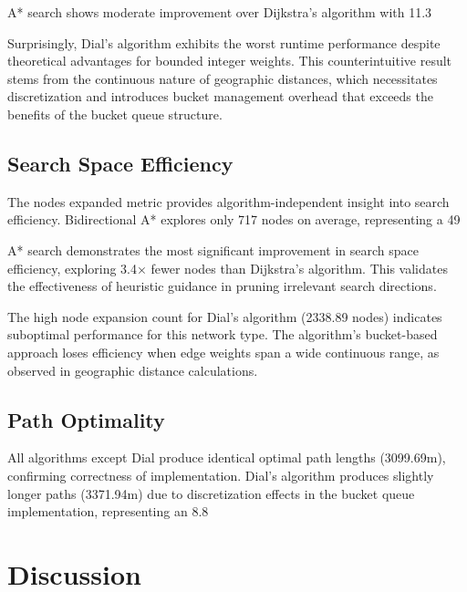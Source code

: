 \documentclass[conference]{IEEEtran}
\begin{document}
A* search shows moderate improvement over Dijkstra's algorithm with 11.3%

Surprisingly, Dial's algorithm exhibits the worst runtime performance despite theoretical advantages for bounded integer weights. This counterintuitive result stems from the continuous nature of geographic distances, which necessitates discretization and introduces bucket management overhead that exceeds the benefits of the bucket queue structure.

\subsection{Search Space Efficiency}

The nodes expanded metric provides algorithm-independent insight into search efficiency. Bidirectional A* explores only 717 nodes on average, representing a 49%

A* search demonstrates the most significant improvement in search space efficiency, exploring 3.4× fewer nodes than Dijkstra's algorithm. This validates the effectiveness of heuristic guidance in pruning irrelevant search directions.

The high node expansion count for Dial's algorithm (2338.89 nodes) indicates suboptimal performance for this network type. The algorithm's bucket-based approach loses efficiency when edge weights span a wide continuous range, as observed in geographic distance calculations.

\subsection{Path Optimality}

All algorithms except Dial produce identical optimal path lengths (3099.69m), confirming correctness of implementation. Dial's algorithm produces slightly longer paths (3371.94m) due to discretization effects in the bucket queue implementation, representing an 8.8%

\section{Discussion}
\end{document}
